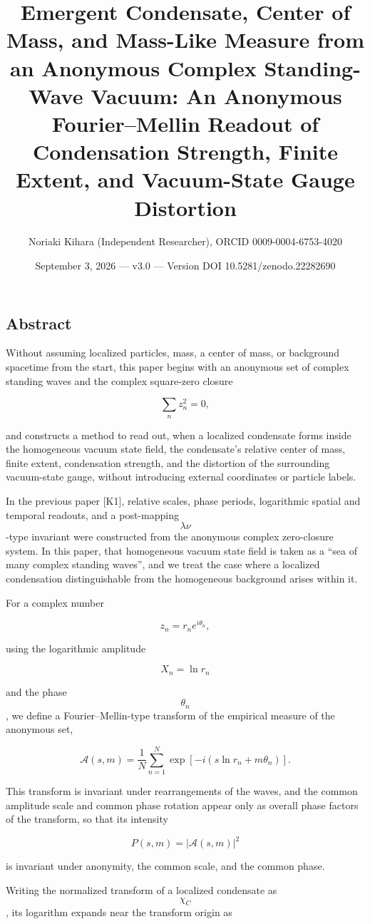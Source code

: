 \documentclass[
  a4paper,
]{article}
\title{Emergent Condensate, Center of Mass, and Mass-Like Measure from
an Anonymous Complex Standing-Wave Vacuum: An Anonymous Fourier--Mellin
Readout of Condensation Strength, Finite Extent, and Vacuum-State Gauge
Distortion}
\author{Noriaki Kihara (Independent Researcher), ORCID
0009-0004-6753-4020}
\date{September 3, 2026 --- v3.0 --- Version DOI
10.5281/zenodo.22282690}
\begin{document}
\maketitle

\subsection{Abstract}\label{abstract}

Without assuming localized particles, mass, a center of mass, or
background spacetime from the start, this paper begins with an anonymous
set of complex standing waves and the complex square-zero closure

\[
\sum_n z_n^2=0,
\]

and constructs a method to read out, when a localized condensate forms
inside the homogeneous vacuum state field, the condensate's relative
center of mass, finite extent, condensation strength, and the distortion
of the surrounding vacuum-state gauge, without introducing external
coordinates or particle labels.

In the previous paper {[}K1{]}, relative scales, phase periods,
logarithmic spatial and temporal readouts, and a post-mapping
\[\lambda\nu\]-type invariant were constructed from the anonymous
complex zero-closure system. In this paper, that homogeneous vacuum
state field is taken as a ``sea of many complex standing waves'', and we
treat the case where a localized condensation distinguishable from the
homogeneous background arises within it.

For a complex number

\[
z_n=r_n e^{i\theta_n},
\]

using the logarithmic amplitude

\[
X_n=\ln r_n
\]

and the phase \[\theta_n\], we define a Fourier--Mellin-type transform
of the empirical measure of the anonymous set,

\[
\mathcal A(s,m)
=
\frac{1}{N}
\sum_{n=1}^{N}
\exp\left[
-i\left(
s\ln r_n+m\theta_n
\right)
\right].
\]

This transform is invariant under rearrangements of the waves, and the
common amplitude scale and common phase rotation appear only as overall
phase factors of the transform, so that its intensity

\[
P(s,m)=|\mathcal A(s,m)|^2
\]

is invariant under anonymity, the common scale, and the common phase.

Writing the normalized transform of a localized condensate as
\[\chi_C\], its logarithm expands near the transform origin as
\end{document}
